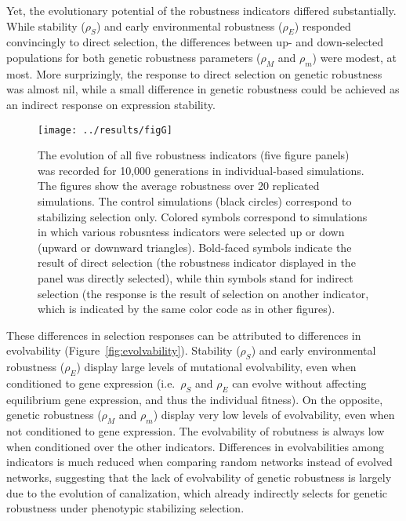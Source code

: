 \documentclass[a4paper]{article}
\newcommand{\stability}{{\rho_S}}
\newcommand{\earlyenv}{{\rho_E}}
\newcommand{\earlymut}{{\rho_M}}
\newcommand{\latemut}{{\rho_m}}
\begin{document}
Yet, the evolutionary potential of the robustness indicators differed substantially. While stability ($\stability$) and early environmental robustness ($\earlyenv$) responded convincingly to direct selection, the differences between up- and down-selected populations for both genetic robustness parameters ($\earlymut$ and $\latemut$) were modest, at most. More surprizingly, the response to direct selection on genetic robustness was almost nil, while a small difference in genetic robustness could be achieved as an indirect response on expression stability. 

\begin{figure}[t]
\begin{center}
\texttt{[image: ../results/figG]}
\caption{\label{fig:evol} The evolution of all five robustness indicators (five figure panels) was recorded for 10,000 generations in individual-based simulations. The figures show the average robustness over 20 replicated simulations. The control simulations (black circles) correspond to stabilizing selection only. Colored symbols correspond to simulations in which various robusntess indicators were selected up or down (upward or downward triangles). Bold-faced symbols indicate the result of direct selection (the robustness indicator displayed in the panel was directly selected), while thin symbols stand for indirect selection (the response is the result of selection on another indicator, which is indicated by the same color code as in other figures). }
\end{center}
\end{figure}

These differences in selection responses can be attributed to differences in evolvability (Figure~\ref{fig:evolvability}). Stability ($\stability$) and early environmental robustness ($\earlyenv$) display large levels of mutational evolvability, even when conditioned to gene expression (i.e.\, $\stability$ and $\earlyenv$ can evolve without affecting equilibrium gene expression, and thus the individual fitness). On the opposite, genetic robustness ($\earlymut$ and $\latemut$) display very low levels of evolvability, even when not conditioned to gene expression. The evolvability of robutness is always low when conditioned over the other indicators. Differences in evolvabilities among indicators is much reduced when comparing random networks instead of evolved networks, suggesting that the lack of evolvability of genetic robustness is largely due to the evolution of canalization, which already indirectly selects for genetic robustness under phenotypic stabilizing selection. 
\end{document}
